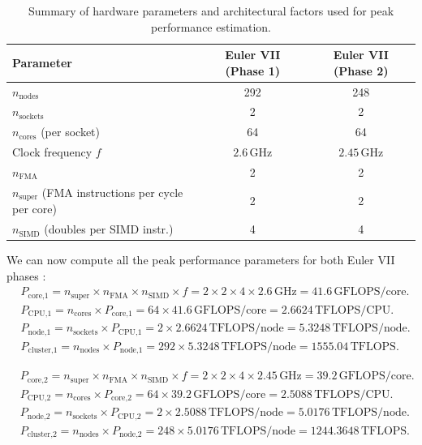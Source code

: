 \documentclass[unicode,10pt,a4paper,oneside,numbers=endperiod,openany]{scrartcl}
\begin{document}
\begin{table}[h]
\centering
\begin{tabular}{lcc}
\hline
\textbf{Parameter} & \textbf{Euler VII (Phase 1)} & \textbf{Euler VII (Phase 2)} \\
\hline
$n_{\text{nodes}}$ & 292 & 248 \\
$n_{\text{sockets}}$ & 2 & 2 \\
$n_{\text{cores}}$ (per socket) & 64 & 64 \\
Clock frequency $f$ & $2.6\,\text{GHz}$ & $2.45\,\text{GHz}$ \\
$n_{\text{FMA}}$ & 2 & 2 \\
$n_{\text{super}}$ (FMA instructions per cycle per core) & 2 & 2 \\
$n_{\text{SIMD}}$ (doubles per SIMD instr.) & 4 & 4 \\
\hline
\end{tabular}
\caption{Summary of hardware parameters and architectural factors used for peak performance estimation.}
\end{table}
We can now compute all the peak performance parameters for both Euler VII phases :
\begin{align*}
&P_{\text{core,1}} =  n_{\text{super}} \times  n_{\text{FMA}} \times n_{\text{SIMD}} \times f = 2 \times 2 \times 4 \times 2.6\,\text{GHz} = 41.6\,\text{GFLOPS/core}. \\
&P_{\text{CPU,1}} = n_{\text{cores}} \times P_{\text{core,1}} = 64 \times 41.6\,\text{GFLOPS/core} = 2.6624\,\text{TFLOPS/CPU}. \\
&P_{\text{node,1}} = n_{\text{sockets}} \times P_{\text{CPU,1}} = 2 \times 2.6624\,\text{TFLOPS/node} = 5.3248\,\text{TFLOPS/node}. \\
&P_{\text{cluster,1}} = n_{\text{nodes}} \times P_{\text{node,1}} = 292 \times 5.3248\,\text{TFLOPS/node} = 1555.04\,\text{TFLOPS}.
\end{align*}


\begin{align*}
&P_{\text{core,2}} =  n_{\text{super}} \times  n_{\text{FMA}} \times n_{\text{SIMD}} \times f = 2 \times 2 \times 4 \times 2.45\,\text{GHz} = 39.2\,\text{GFLOPS/core}. \\
&P_{\text{CPU,2}} = n_{\text{cores}} \times P_{\text{core,2}} = 64 \times 39.2\,\text{GFLOPS/core} = 2.5088\,\text{TFLOPS/CPU}. \\
&P_{\text{node,2}} = n_{\text{sockets}} \times P_{\text{CPU,2}} = 2 \times 2.5088\,\text{TFLOPS/node} = 5.0176\,\text{TFLOPS/node}. \\
&P_{\text{cluster,2}} = n_{\text{nodes}} \times P_{\text{node,2}} = 248 \times 5.0176\,\text{TFLOPS/node} = 1244.3648\,\text{TFLOPS}.
\end{align*}
\end{document}

